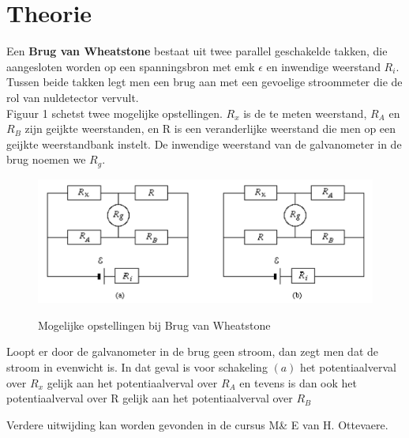 \section{Theorie}

Een \textbf{Brug van Wheatstone} bestaat uit twee parallel geschakelde takken,
die aangesloten worden op een spanningsbron met emk $\epsilon$ en inwendige 
weerstand $R_{i}$. Tussen beide takken legt men een brug aan met een gevoelige
stroommeter die de rol van nuldetector vervult. 
\\

Figuur 1 schetst twee mogelijke opstellingen.
$R_{x}$ is de te meten weerstand, $R_{A}$ en $R_{B}$ zijn geijkte weerstanden, en R is een 
veranderlijke weerstand die men op een geijkte weerstandbank instelt. De inwendige weerstand 
van de galvanometer in de brug noemen we $R_{g}$.
\\

\begin{figure}[H]
    \centering
    \caption{Mogelijke opstellingen bij Brug van Wheatstone}
    \includegraphics[width=\textwidth]{img/brug.png}
    \label{fig:grafiek}
\end{figure}

Loopt er door de galvanometer in de brug geen stroom, dan zegt men dat de stroom in evenwicht is.
In dat geval is voor schakeling $(a)$ het potentiaalverval over $R_{x}$ gelijk aan het potentiaalverval 
over $R_{A}$ en tevens is dan ook het potentiaalverval over R gelijk aan het potentiaalverval over $R_{B}$

Verdere uitwijding kan worden gevonden in de cursus M\& E
van H. Ottevaere\cite{cursusMnE}.